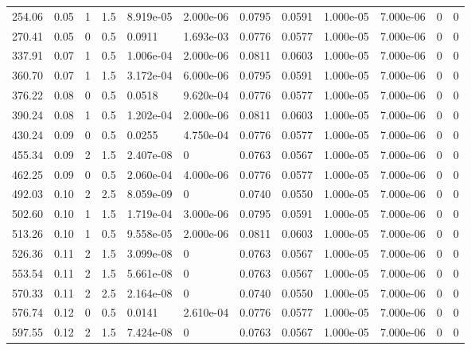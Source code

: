 \documentclass[preview]{standalone}
\begin{document}
{{\begin{tabular}{L{1.2cm}C{1.2cm} C{0.3cm}C{0.5cm} C{1.4cm}C{1.4cm} C{1.4cm}C{1.4cm} C{1.6cm}C{1.6cm} C{1.6cm}C{1.6cm}}
  254.06  &  0.05  & 1     & 1.5 &  8.919e-05  & 2.000e-06  &  0.0795&   0.0591& 1.000e-05 & 7.000e-06   &  0 & 0  \\ 
  270.41  &  0.05  & 0     & 0.5 &  0.0911  & 1.693e-03  &  0.0776&   0.0577& 1.000e-05 & 7.000e-06   &  0 & 0  \\ 
  337.91  &  0.07  & 1     & 0.5 &  1.006e-04  & 2.000e-06  &  0.0811&   0.0603& 1.000e-05 & 7.000e-06   &  0 & 0  \\ 
  360.70  &  0.07  & 1     & 1.5 &  3.172e-04  & 6.000e-06  &  0.0795&   0.0591& 1.000e-05 & 7.000e-06   &  0 & 0  \\ 
  376.22  &  0.08  & 0     & 0.5 &  0.0518  & 9.620e-04  &  0.0776&   0.0577& 1.000e-05 & 7.000e-06   &  0 & 0  \\ 
  390.24  &  0.08  & 1     & 0.5 &  1.202e-04  & 2.000e-06  &  0.0811&   0.0603& 1.000e-05 & 7.000e-06   &  0 & 0  \\ 
  430.24  &  0.09  & 0     & 0.5 &  0.0255  & 4.750e-04  &  0.0776&   0.0577& 1.000e-05 & 7.000e-06   &  0 & 0  \\ 
  455.34  &  0.09  & 2     & 1.5 &  2.407e-08  & 0  &  0.0763&   0.0567& 1.000e-05 & 7.000e-06   &  0 & 0  \\ 
  462.25  &  0.09  & 0     & 0.5 &  2.060e-04  & 4.000e-06  &  0.0776&   0.0577& 1.000e-05 & 7.000e-06   &  0 & 0  \\ 
  492.03  &  0.10  & 2     & 2.5 &  8.059e-09  & 0  &  0.0740&   0.0550& 1.000e-05 & 7.000e-06   &  0 & 0  \\ 
  502.60  &  0.10  & 1     & 1.5 &  1.719e-04  & 3.000e-06  &  0.0795&   0.0591& 1.000e-05 & 7.000e-06   &  0 & 0  \\ 
  513.26  &  0.10  & 1     & 0.5 &  9.558e-05  & 2.000e-06  &  0.0811&   0.0603& 1.000e-05 & 7.000e-06   &  0 & 0  \\ 
  526.36  &  0.11  & 2     & 1.5 &  3.099e-08  & 0  &  0.0763&   0.0567& 1.000e-05 & 7.000e-06   &  0 & 0  \\ 
  553.54  &  0.11  & 2     & 1.5 &  5.661e-08  & 0  &  0.0763&   0.0567& 1.000e-05 & 7.000e-06   &  0 & 0  \\ 
  570.33  &  0.11  & 2     & 2.5 &  2.164e-08  & 0  &  0.0740&   0.0550& 1.000e-05 & 7.000e-06   &  0 & 0  \\ 
  576.74  &  0.12  & 0     & 0.5 &  0.0141  & 2.610e-04  &  0.0776&   0.0577& 1.000e-05 & 7.000e-06   &  0 & 0  \\ 
  597.55  &  0.12  & 2     & 1.5 &  7.424e-08  & 0  &  0.0763&   0.0567& 1.000e-05 & 7.000e-06   &  0 & 0  \\ 

\end{tabular}}}
\end{document}
